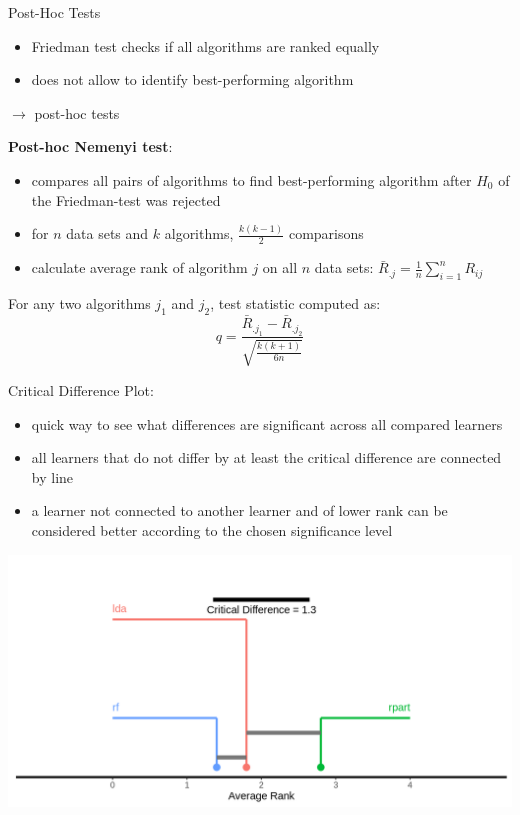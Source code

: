     \begin{frame}[c,allowframebreaks]{Post-Hoc Tests}
        \begin{itemize}
            \item Friedman test checks if all algorithms are ranked equally
            \item does not allow to identify best-performing algorithm
        \end{itemize}
        $\rightarrow$ post-hoc tests

    \bigskip

    \textbf{Post-hoc Nemenyi test}:
    \begin{itemize}
    \item compares all pairs of algorithms to find best-performing algorithm after $H_0$ of the Friedman-test was rejected
    \item for $n$ data sets and $k$ algorithms, $\frac{k(k-1)}{2}$ comparisons
    \item calculate average rank of algorithm $j$ on all $n$ data sets: $\bar{R}_{.j} =\frac{1}{n} \sum_{i=1}^n R_{ij}$
    \end{itemize}

    For any two algorithms $j_1$ and $j_2$, test statistic computed as:
    $$q = \frac{\bar{R}_{.j_1} - \bar{R}_{.j_2}}{\sqrt{\frac{k(k+1)}{6n}}}$$

    \framebreak

    Critical Difference Plot:
    \begin{itemize}
        \item quick way to see what differences are significant across all
            compared learners
        \item all learners that do not differ by at least the critical
            difference are connected by line
        \item a learner not connected to another learner and of lower rank can
            be considered better according to the chosen significance level
    \end{itemize}

    \begin{center}
        \includegraphics[height=.5\textheight]{crit-diff-nemenyi}
    \end{center}


\end{frame}
